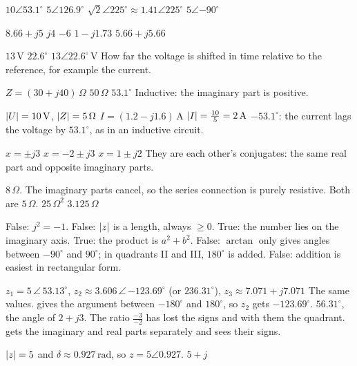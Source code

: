 \begin{facit}
  $10\angle 53.1^{\circ}$  $5\angle 126.9^{\circ}$
 $\sqrt{2}\angle 225^{\circ} \approx 1.41\angle 225^{\circ}$  $5\angle{-90^{\circ}}$

  $8.66 + j5$  $j4$  $-6$  $1 - j1.73$
 $5.66 + j5.66$

  $13\,\text{V}$  $22.6^{\circ}$  $13\angle 22.6^{\circ}\,\text{V}$
 How far the voltage is shifted in time relative to the reference, for example the current.

  $Z = (30 + j40)\,\Omega$  $50\,\Omega$  $53.1^{\circ}$
 Inductive: the imaginary part is positive.

  $\lvert U\rvert = 10\,\text{V}$, $\lvert Z\rvert = 5\,\Omega$
 $I = (1.2 - j1.6)\,\text{A}$  $\lvert I\rvert = \frac{10}{5} = 2\,\text{A}$
 $-53.1^{\circ}$: the current lags the voltage by $53.1^{\circ}$, as in an inductive
circuit.

  $x = \pm j3$  $x = -2 \pm j3$  $x = 1 \pm j2$
 They are each other's conjugates: the same real part and opposite imaginary parts.

  $8\,\Omega$. The imaginary parts cancel, so the series connection is purely
resistive.  Both are $5\,\Omega$.  $25\,\Omega^2$  $3.125\,\Omega$

  False: $j^2 = -1$.
 False: $\lvert z\rvert$ is a length, always $\geq 0$.
 True: the number lies on the imaginary axis.
 True: the product is $a^2 + b^2$.
 False: $\arctan$ only gives angles between $-90^{\circ}$ and $90^{\circ}$; in quadrants II
and III, $180^{\circ}$ is added.
 False: addition is easiest in rectangular form.

  $z_1 = 5\,\angle\,53.13^{\circ}$,
$z_2 \approx 3.606\,\angle\,{-123.69^{\circ}}$ (or $236.31^{\circ}$),
$z_3 \approx 7.071 + j7.071$
 The same values.  gives the argument between $-180^{\circ}$ and $180^{\circ}$,
so $z_2$ gets $-123.69^{\circ}$.
 $56.31^{\circ}$, the angle of $2 + j3$. The ratio $\frac{-3}{-2}$ has lost the signs and with
them the quadrant.  gets the imaginary and real parts separately and sees their signs.

  $\lvert z\rvert = 5$ and $\delta \approx 0.927\,\text{rad}$, so
$z = 5\angle 0.927$.  $5 + j$

\end{facit}
